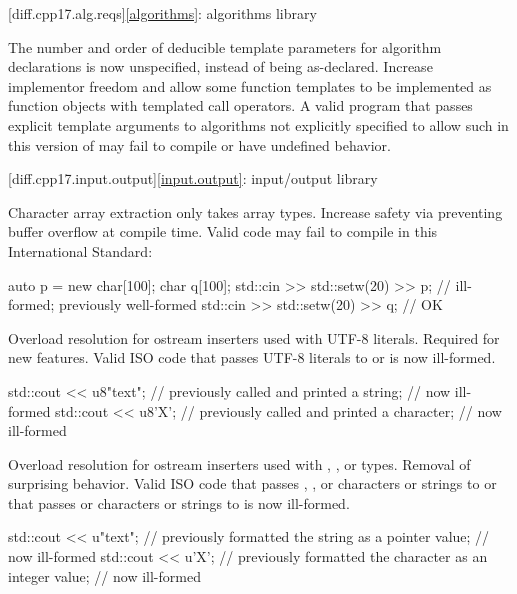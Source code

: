 [diff.cpp17.alg.reqs]{\ref{algorithms}: algorithms library}

\change
The number and order of deducible template parameters for algorithm declarations
is now unspecified, instead of being as-declared.
\rationale
Increase implementor freedom and allow some function templates
to be implemented as function objects with templated call operators.
\effect
A valid \CppXVII{} program that passes explicit template arguments to
algorithms not explicitly specified to allow such in this version of \Cpp{}
may fail to compile or have undefined behavior.

[diff.cpp17.input.output]{\ref{input.output}: input/output library}

\change
Character array extraction only takes array types.
\rationale
Increase safety via preventing buffer overflow at compile time.
\effect
Valid \CppXVII{} code may fail to compile in this International Standard:
\begin{codeblock}
auto p = new char[100];
char q[100];
std::cin >> std::setw(20) >> p;         // ill-formed; previously well-formed
std::cin >> std::setw(20) >> q;         // OK
\end{codeblock}

\change
Overload resolution for ostream inserters used with UTF-8 literals.
\rationale
Required for new features.
\effect
Valid ISO \CppXVII{} code that passes UTF-8 literals to
 or
 is now ill-formed.
\begin{codeblock}
std::cout << u8"text";          // previously called  and printed a string;
                                // now ill-formed
std::cout << u8'X';             // previously called  and printed a character;
                                // now ill-formed
\end{codeblock}

\change
Overload resolution for ostream inserters
used with , , or  types.
\rationale
Removal of surprising behavior.
\effect
Valid ISO \CppXVII{} code that passes
, , or  characters or strings
to  or
that passes  or  characters or strings
to  is now ill-formed.
\begin{codeblock}
std::cout << u"text";           // previously formatted the string as a pointer value;
                                // now ill-formed
std::cout << u'X';              // previously formatted the character as an integer value;
                                // now ill-formed
\end{codeblock}

